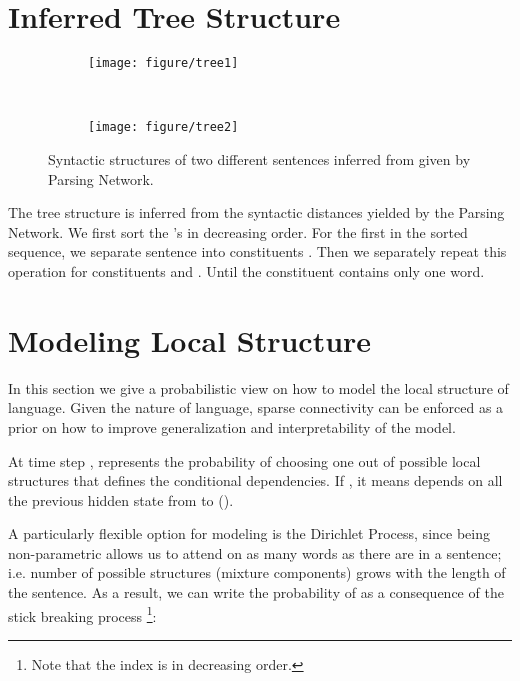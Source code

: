 \documentclass{article} \usepackage{iclr2018_conference,times}
\begin{document}
\section{Inferred Tree Structure}
\label{appendix_tree_fig}
\begin{figure}[h!]
    \centering
    \setlength{\leftskip}{-30pt}
    \begin{subfigure}[b]{0.49\textwidth}
        \texttt{[image: figure/tree1]}
    \end{subfigure}
    ~ 
    \begin{subfigure}[b]{0.49\textwidth}
        \texttt{[image: figure/tree2]}
    \end{subfigure}
    \caption{Syntactic structures of two different sentences inferred from  given by Parsing Network.}
\end{figure}

The tree structure is inferred from the syntactic distances yielded by the Parsing Network. We first sort the 's in decreasing order. 
For the first  in the sorted sequence, we separate sentence into constituents . Then we separately repeat this operation for constituents  and . Until the constituent contains only one word.



\section{Modeling Local Structure} \label{appendix_MLS}
In this section we give a probabilistic view on how to model the local structure of language. 
Given the nature of language, sparse connectivity can be enforced as a prior on how to improve generalization and interpretability of the model.







At time step ,  represents the probability of choosing one out of  possible local structures that defines the conditional dependencies. 
If , it means  depends on all the previous hidden state from  to  (). 

A particularly flexible option for modeling  is the Dirichlet Process, since being non-parametric allows us to attend on as many words as there are in a sentence; 
i.e. number of possible structures (mixture components) grows with the length of the sentence.
As a result, we can write the probability of  as a consequence of the stick breaking process \footnote{Note that the index is in decreasing order.}:
\end{document}
